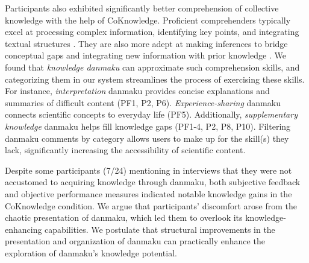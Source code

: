 Participants also exhibited significantly better comprehension of collective knowledge with the help of CoKnowledge. 
Proficient comprehenders typically excel at processing complex information, identifying key points, and integrating textual structures \cite{mcnamara2009toward, long1993superordinate, singer1992individual}. They are also more adept at making inferences to bridge conceptual gaps and integrating new information with prior knowledge \cite{garnham1982referential, magliano2002using, mcnamara2009toward}. 
We found that \textit{knowledge danmaku} can approximate such comprehension skills, and categorizing them in our system streamlines the process of exercising these skills. 
For instance, \textit{interpretation} danmaku provides concise explanations and summaries of difficult content (PF1, P2, P6).
\textit{Experience-sharing} danmaku connects scientific concepts to everyday life (PF5). Additionally, \textit{supplementary knowledge} danmaku helps fill knowledge gaps (PF1-4, P2, P8, P10). 
Filtering danmaku comments by category allows users to make up for the skill(s) they lack, significantly increasing the accessibility of scientific content.


Despite some participants (7/24) mentioning in interviews that they were not accustomed to acquiring knowledge through danmaku, both subjective feedback and objective performance measures indicated notable knowledge gains in the CoKnowledge condition. We argue that participants' discomfort arose from the chaotic presentation of danmaku, which led them to overlook its knowledge-enhancing capabilities. 
We postulate that structural improvements in the presentation and organization of danmaku can practically enhance the exploration of danmaku's knowledge potential.


